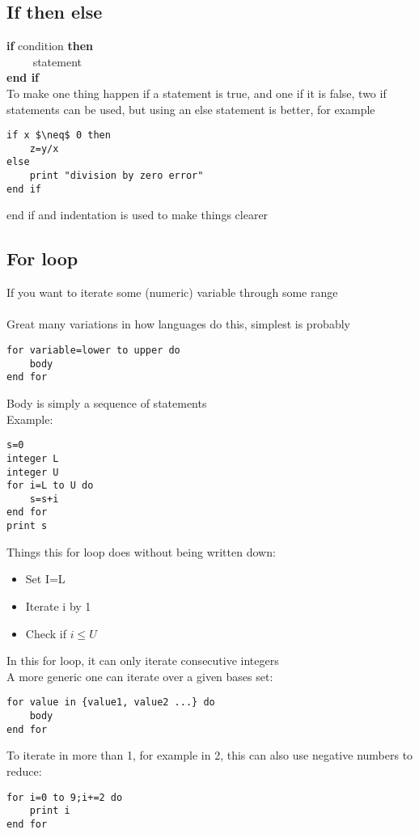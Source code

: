 \documentclass{article}[18pt]
\begin{document}
\subsection{If then else}
\textbf{if} condition \textbf{then}\\
$\textrm{} \qquad$ statement\\
\textbf{end if}\\
To make one thing happen if a statement is true, and one if it is false, two if statements can be used, but using an else statement is better, for example\\
\begin{lstlisting}[mathescape=true]
if x $\neq$ 0 then
	z=y/x
else
	print "division by zero error"
end if
\end{lstlisting}



end if and indentation is used to make things clearer
\subsection{For loop}
If you want to iterate some (numeric) variable through some range\\
\\
Great many variations in how languages do this, simplest is probably
\begin{lstlisting}[mathescape=true]
for variable=lower to upper do
	body
end for
\end{lstlisting}
Body is simply a sequence of statements\\
Example:
\begin{lstlisting}[mathescape=true]
s=0
integer L
integer U
for i=L to U do
	s=s+i
end for
print s
\end{lstlisting}
Things this for loop does without being written down:
\begin{itemize}
\item Set I=L
\item Iterate i by 1
\item Check if $i\leqslant U$
\end{itemize}


In this for loop, it can only iterate consecutive integers\\
A more generic one can iterate over a given bases set:
\begin{lstlisting}[mathescape=true]
for value in {value1, value2 ...} do
	body
end for
\end{lstlisting}
To iterate in more than 1, for example in 2, this can also use negative numbers to reduce:
\begin{lstlisting}[mathescape=true]
for i=0 to 9;i+=2 do
	print i
end for
\end{lstlisting}
\end{document}
